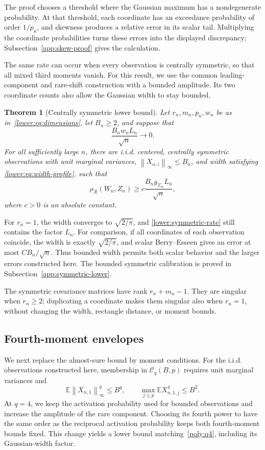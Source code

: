 \documentclass[11pt,letterpaper,twoside,leqno]{article}
\theoremstyle{bookplain}
\newtheorem{theorem}{Theorem}
\theoremstyle{bookremark}
\newcommand{\E}{\mathbb E}
\newcommand{\norm}[1]{\left\lVert#1\right\rVert}
\newcommand{\rh}{\rho_{\mathcal R}}
\begin{document}
The proof chooses a threshold where the Gaussian maximum has a
nondegenerate probability. At that threshold, each coordinate has
an exceedance probability of order $1/p_n$, and skewness produces
a relative error in its scalar tail. Multiplying the coordinate
probabilities turns these errors into the displayed discrepancy;
Subsection~\ref{app:skew-proof} gives the calculation.

The same rate can occur when every observation is centrally symmetric,
so that all mixed third moments vanish. For this result, we use the
common leading-component and rare-shift construction with a bounded
amplitude. Its two coordinate counts also allow the Gaussian width
to stay bounded.

\begin{theorem}[Centrally symmetric lower bound]\label{opt:symmetric-lower}
Let \(r_n,m_n,p_n,w_n\) be as in~\eqref{lower:eq:dimensions},
let \(B_n\ge2\), and suppose that
\[
 \frac{B_n w_nL_n}{\sqrt n}\longrightarrow0.
\]
For all sufficiently large \(n\), there are i.i.d. centered,
centrally symmetric observations with unit marginal variances,
\(\norm{X_{n,i}}_\infty\le B_n\), and width satisfying
\eqref{lower:eq:width-profile}, such that
\begin{equation}
 \rh(W_n,Z_n)\ge c\frac{B_n g_{\Sigma_n}L_n}{\sqrt n},
 \label{lower:symmetric-rate}
\end{equation}
where \(c>0\) is an absolute constant.
\end{theorem}

For $r_n=1$, the width converges to $\sqrt{2/\pi}$, and
\eqref{lower:symmetric-rate} still contains the factor $L_n$.
For comparison, if all coordinates of each observation coincide,
the width is exactly $\sqrt{2/\pi}$, and scalar Berry--Esseen
gives an error at most $CB_n/\sqrt n$. Thus bounded width
permits both scalar behavior and the larger errors constructed here.
The bounded symmetric calibration is proved in
Subsection~\ref{app:symmetric-lower}.

The symmetric covariance matrices have rank $r_n+m_n-1$.
They are singular when $r_n\ge2$; duplicating a coordinate
makes them singular also when $r_n=1$, without changing the
width, rectangle distance, or moment bounds.

\subsection{Fourth-moment envelopes}\label{opt:q4-comparison}

We next replace the almost-sure bound by moment conditions. For the
i.i.d. observations constructed here, membership in $\mathcal C_q(B,p)$
requires unit marginal variances and
\[
 \E\norm{X_{n,1}}_\infty^q\le B^q,\qquad
 \max_{j\le p}\E X_{n,1,j}^4\le B^2.
\]
At $q=4$, we keep the activation probability used for bounded
observations and increase the amplitude of the rare component.
Choosing its fourth power to have the same order as the reciprocal
activation probability keeps both fourth-moment bounds fixed.
This change yields a lower bound matching~\eqref{poly:q4}, including
its Gaussian-width factor.
\end{document}
